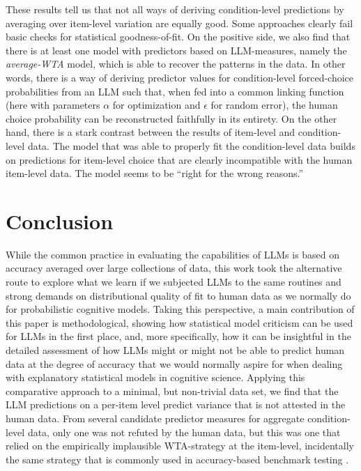 \documentclass[fleqn]{article}
\begin{document}
These results tell us that not all ways of deriving condition-level predictions by averaging over item-level variation are equally good.
Some approaches clearly fail basic checks for statistical goodness-of-fit.
On the positive side, we also find that there is at least one model with predictors based on LLM-measures, namely the \emph{average-WTA} model, which is able to recover the patterns in the data.
In other words, there is a way of deriving predictor values for condition-level forced-choice probabilities from an LLM such that, when fed into a common linking function (here with parameters $\alpha$ for optimization and $\epsilon$ for random error), the human choice probability can be reconstructed faithfully in its entirety.
On the other hand, there is a stark contrast between the results of item-level and condition-level data.
The model that was able to properly fit the condition-level data builds on predictions for item-level choice that are clearly incompatible with the human item-level data.
The model seems to be ``right for the wrong reasons.''



\section{Conclusion}
\label{conclusion}

While the common practice in evaluating the capabilities of LLMs is based on accuracy averaged over large collections of data, this work took the alternative route to explore what we learn if we subjected LLMs to the same routines and strong demands on distributional quality of fit to human data as we normally do for probabilistic cognitive models.
Taking this perspective, a main contribution of this paper is methodological, showing how statistical model criticism can be used for LLMs in the first place, and, more specifically, how it can be insightful in the detailed assessment of how LLMs might or might not be able to predict human data at the degree of accuracy that we would normally aspire for when dealing with explanatory statistical models in cognitive science.
Applying this comparative approach to a minimal, but non-trivial data set, we find that the LLM predictions on a per-item level predict variance that is not attested in the human data.
From several candidate predictor measures for aggregate condition-level data, only one was not refuted by the human data, but this was one that relied on the empirically implausible WTA-strategy at the item-level, incidentally the same strategy that is commonly used in accuracy-based benchmark testing \citep{srivastava2023-BIGbench}.
\end{document}
